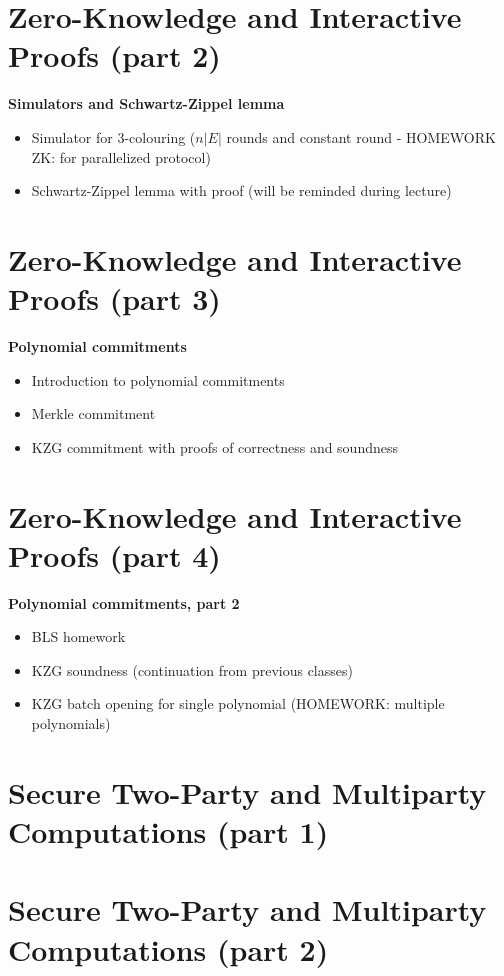 \documentclass{llncs}
\begin{document}
\section{Zero-Knowledge and Interactive Proofs (part 2)}
\textbf{Simulators and Schwartz-Zippel lemma}
\begin{itemize}
	\item Simulator for 3-colouring ($n|E|$ rounds and constant round - HOMEWORK ZK: for parallelized protocol)
	\item Schwartz-Zippel lemma with proof (will be reminded during lecture)	
\end{itemize}

\section{Zero-Knowledge and Interactive Proofs (part 3)}
\textbf{Polynomial commitments}
\begin{itemize}
	\item Introduction to polynomial commitments
	\item Merkle commitment
	\item KZG commitment with proofs of correctness and soundness
\end{itemize}


\section{Zero-Knowledge and Interactive Proofs (part 4)}
\textbf{Polynomial commitments, part 2}
\begin{itemize}
	\item BLS homework
	\item KZG soundness (continuation from previous classes)
	\item KZG batch opening for single polynomial (HOMEWORK: multiple polynomials)
\end{itemize}

\section{Secure Two-Party and Multiparty Computations (part 1)}

\section{Secure Two-Party and Multiparty Computations (part 2)}
\end{document}
